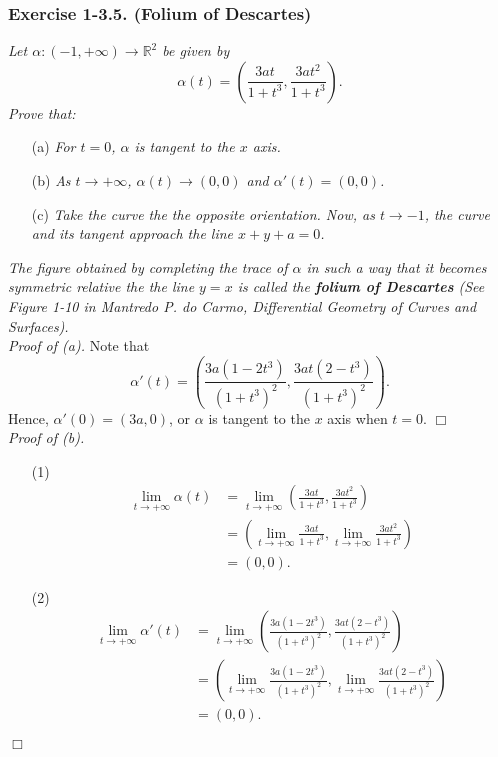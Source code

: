 \documentclass{article}
\begin{document}
\subsubsection*{Exercise 1-3.5. (Folium of Descartes)}
\emph{Let $\alpha: (-1, +\infty) \to \mathbb{R}^2$ be given by
\[
  \alpha(t) = \left( \frac{3at}{1+t^3}, \frac{3at^2}{1+t^3} \right).
\]
Prove that:}
\begin{enumerate}
\item[(a)]
  \emph{For $t = 0$, $\alpha$ is tangent to the $x$ axis.}

\item[(b)]
  \emph{As $t \to +\infty$, $\alpha(t) \to (0,0)$ and $\alpha'(t) = (0,0)$.}

\item[(c)]
  \emph{Take the curve the the opposite orientation.
  Now, as $t \to -1$, the curve and its tangent approach the line $x+y+a=0$.}
\end{enumerate}
\emph{The figure obtained by completing the trace of $\alpha$ in such a way that
it becomes symmetric relative the the line $y = x$ is called the
\textbf{folium of Descartes}
(See Figure 1-10 in Mantredo P. do Carmo, Differential Geometry of Curves and Surfaces).} \\



\emph{Proof of (a).}
  Note that
  \[
    \alpha'(t) = \left( \frac{3a(1-2t^3)}{(1+t^3)^2}, \frac{3at(2-t^3)}{(1+t^3)^2} \right).
  \]
  Hence, $\alpha'(0) = (3a, 0)$, or $\alpha$ is tangent to the $x$ axis when $t = 0$.
$\Box$ \\



\emph{Proof of (b).}
\begin{enumerate}
\item[(1)]
  \begin{align*}
    \lim_{t \to +\infty} \alpha(t)
    &= \lim_{t \to +\infty} \left( \frac{3at}{1+t^3}, \frac{3at^2}{1+t^3} \right) \\
    &= \left( \lim_{t \to +\infty} \frac{3at}{1+t^3},
      \lim_{t \to +\infty} \frac{3at^2}{1+t^3} \right) \\
    &= (0, 0).
  \end{align*}
\item[(2)]
  \begin{align*}
    \lim_{t \to +\infty} \alpha'(t)
    &= \lim_{t \to +\infty} \left( \frac{3a(1-2t^3)}{(1+t^3)^2}, \frac{3at(2-t^3)}{(1+t^3)^2} \right) \\
    &= \left( \lim_{t \to +\infty} \frac{3a(1-2t^3)}{(1+t^3)^2},
      \lim_{t \to +\infty} \frac{3at(2-t^3)}{(1+t^3)^2} \right) \\
    &= (0, 0).
  \end{align*}
\end{enumerate}
$\Box$ \\
\end{document}
